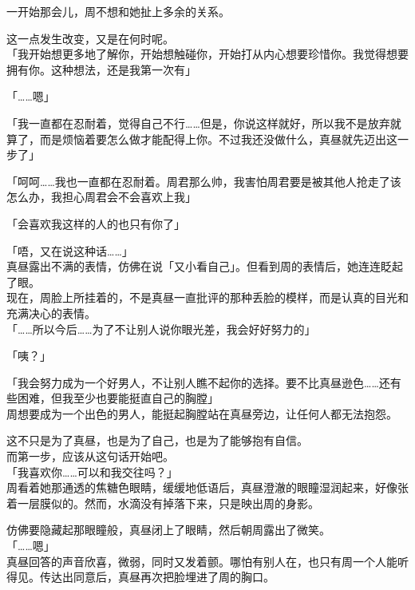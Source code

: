一开始那会儿，周不想和她扯上多余的关系。

这一点发生改变，又是在何时呢。\\

「我开始想更多地了解你，开始想触碰你，开始打从内心想要珍惜你。我觉得想要拥有你。这种想法，还是我第一次有」

「……嗯」

「我一直都在忍耐着，觉得自己不行……但是，你说这样就好，所以我不是放弃就算了，而是烦恼着要怎么做才能配得上你。不过我还没做什么，真昼就先迈出这一步了」

「呵呵……我也一直都在忍耐着。周君那么帅，我害怕周君要是被其他人抢走了该怎么办，我担心周君会不会喜欢上我」

「会喜欢我这样的人的也只有你了」

「唔，又在说这种话……」\\

真昼露出不满的表情，仿佛在说「又小看自己」。但看到周的表情后，她连连眨起了眼。\\

现在，周脸上所挂着的，不是真昼一直批评的那种丢脸的模样，而是认真的目光和充满决心的表情。\\

「……所以今后……为了不让别人说你眼光差，我会好好努力的」

「咦？」

「我会努力成为一个好男人，不让别人瞧不起你的选择。要不比真昼逊色……还有些困难，但我至少也要能挺直自己的胸膛」\\

周想要成为一个出色的男人，能挺起胸膛站在真昼旁边，让任何人都无法抱怨。

这不只是为了真昼，也是为了自己，也是为了能够抱有自信。\\

而第一步，应该从这句话开始吧。\\

「我喜欢你……可以和我交往吗？」\\

周看着她那通透的焦糖色眼睛，缓缓地低语后，真昼澄澈的眼瞳湿润起来，好像张着一层膜似的。然而，水滴没有掉落下来，只是映出周的身影。

仿佛要隐藏起那眼瞳般，真昼闭上了眼睛，然后朝周露出了微笑。\\

「……嗯」\\

真昼回答的声音欣喜，微弱，同时又发着颤。哪怕有别人在，也只有周一个人能听得见。传达出同意后，真昼再次把脸埋进了周的胸口。


